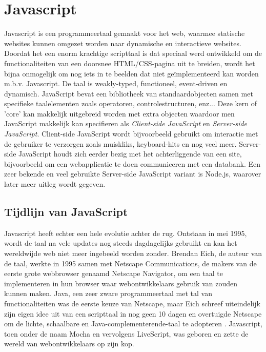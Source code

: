 \section{Javascript}
\label{sec:javascript}
Javascript is een programmeertaal gemaakt voor het web, waarmee statische websites kunnen omgezet worden naar dynamische en interactieve websites. Doordat het een enorm krachtige scripttaal is dat speciaal werd ontwikkeld om de functionaliteiten van een doorsnee HTML/CSS-pagina uit te breiden, wordt het bijna onmogelijk om nog iets in te beelden dat niet geïmplementeerd kan worden m.b.v. Javascript. De taal is weakly-typed, functioneel, event-driven en dynamisch. JavaScript bevat een bibliotheek van standaardobjecten samen met specifieke taalelementen zoals operatoren, controlestructuren, enz... Deze kern of 'core' kan makkelijk uitgebreid worden met extra objecten waardoor men JavaScript makkelijk kan specifieren als \textit{Client-side JavaScript} en \textit{Server-side JavaScript}. Client-side JavaScript wordt bijvoorbeeld gebruikt om interactie met de gebruiker te verzorgen zoals muiskliks, keyboard-hits en nog veel meer. Server-side JavaScript houdt zich eerder bezig met het achterliggende van een site, bijvoorbeeld om een webapplicatie te doen communiceren met een databank. Een zeer bekende en veel gebruikte Server-side JavaScript variant is Node.js, waarover later meer uitleg wordt gegeven. \autocite{Javascript2019}

\subsection{Tijdlijn van JavaScript}
\label{sec:jsTimeline}

Javascript heeft echter een hele evolutie achter de rug. Ontstaan in mei 1995, wordt de taal na vele updates nog steeds dagdagelijks gebruikt en kan het wereldwijde web niet meer ingebeeld worden zonder. Brendan Eich, de auteur van de taal, werkte in 1995 samen met Netscape Communications, de makers van de eerste grote webbrowser genaamd Netscape Navigator, om een taal te implementeren in hun browser waar webontwikkelaars gebruik van zouden kunnen maken. Java, een zeer zware programmeertaal met tal van functionaliteiten was de eerste keuze van Netscape, maar Eich schreef uiteindelijk zijn eigen idee uit van een scripttaal in nog geen 10 dagen en overtuigde Netscape om de lichte, schaalbare en Java-complementerende-taal te adopteren \autocite{Rangpariya2019}. Javascript, toen onder de naam Mocha en vervolgens LiveScript, was geboren en zette de wereld van webontwikkelaars op zijn kop.


